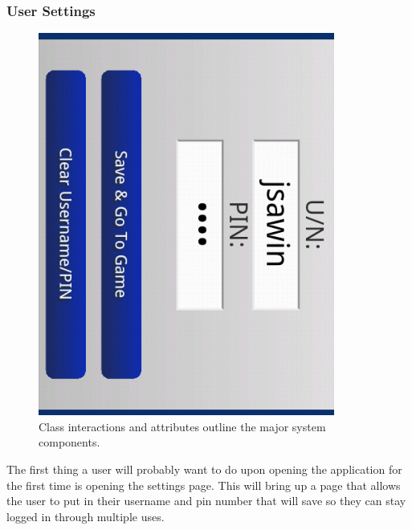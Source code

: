\documentclass[12pt]{article}
\begin{document}
\subsubsection{User Settings}
\begin{figure}
\begin{center}
\includegraphics[scale=.7]{ userNamePinSave.png}
\caption{\label{domainModel}Class interactions and attributes outline the major system components.}
\end{center}
\end{figure}

The first thing a user will probably want to do upon opening the application for the first time is opening the settings page. This will bring up a page that allows the user to put in their username and pin number that will save so they can stay logged in through multiple uses.
\end{document}
